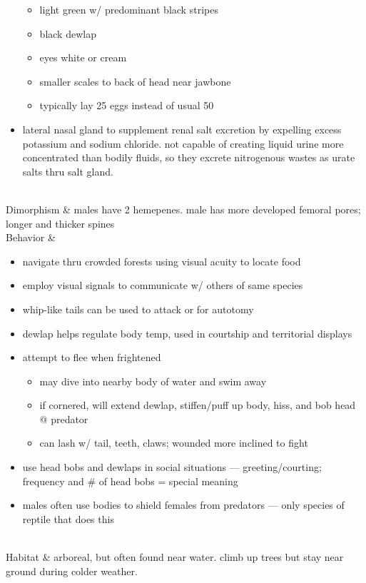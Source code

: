 \begin{center}
\begin{longtabu}
\begin{itemize}[noitemsep]
\begin{itemize}[noitemsep]
				\item light green w/ predominant black stripes
				\item black dewlap
				\item eyes white or cream
				\item smaller scales to back of head near jawbone
				\item typically lay 25 eggs instead of usual 50
			\end{itemize}
		\item lateral nasal gland to supplement renal salt excretion by expelling excess potassium and sodium chloride. not capable of creating liquid urine more concentrated than bodily fluids, so they excrete nitrogenous wastes as urate salts thru salt gland.
	\end{itemize}
	 \\
	\hline
	Dimorphism & 
	males have 2 hemepenes. male has more developed femoral pores; longer and thicker spines
	\\
	\hline
	Behavior & 
	\begin{itemize}[noitemsep]
		\item navigate thru crowded forests using visual acuity to locate food
		\item employ visual signals to communicate w/ others of same species
		\item whip-like tails can be used to attack or for autotomy
		\item dewlap helps regulate body temp, used in courtship and territorial displays
		\item attempt to flee when frightened
			\begin{itemize}[noitemsep]
				\item may dive into nearby body of water and swim away
				\item if cornered, will extend dewlap, stiffen/puff up body, hiss, and bob head @ predator
				\item can lash w/ tail, teeth, claws; wounded more inclined to fight
			\end{itemize}
		\item use head bobs and dewlaps in social situations --- greeting/courting; frequency and \# of head bobs = special meaning
		\item males often use bodies to shield females from predators --- only species of reptile that does this
	\end{itemize}
	\\
	\hline
	Habitat & 
	arboreal, but often found near water. climb up trees but stay near ground during colder weather.

\end{longtabu}
\end{center}
